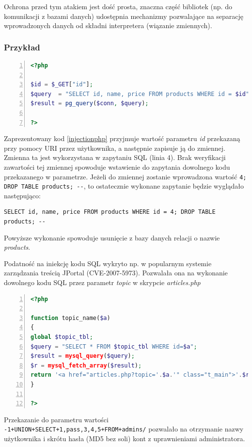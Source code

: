\documentclass[11pt,a4paper,polish,thesis]{dcsbook}
\begin{document}
Ochrona przed tym atakiem jest dość prosta, znaczna część bibliotek (np. do komunikacji z bazami danych) udostępnia mechanizmy pozwalające na separację wprowadzonych danych od składni interpretera (wiązanie zmiennych).

\subsubsection*{Przykład}
\begin{lstlisting}[language=php,frame=single,caption=kod podatny na iniekcję,label=injectionphp,numbers=left]
<?php

$id = $_GET["id"];
$query  = "SELECT id, name, price FROM products WHERE id = $id";
$result = pg_query($conn, $query);

?>
\end{lstlisting}
Zaprezentowany kod \ref{injectionphp} przyjmuje wartość parametru \textit{id} przekazaną przy pomocy URI przez użytkownika, a następnie zapisuje ją do zmiennej. Zmienna ta jest wykorzystana w zapytaniu SQL (linia 4). Brak weryfikacji zawartości tej zmiennej spowoduje wstawienie do zapytania dowolnego kodu przekazanego w parametrze. Jeżeli do zmiennej zostanie wprowadzona wartość \lstinline[frame=single]|4; DROP TABLE products; --|, to ostatecznie wykonane zapytanie będzie wyglądało następująco: 
\begin{lstlisting}
SELECT id, name, price FROM products WHERE id = 4; DROP TABLE products; --
\end{lstlisting}
Powyższe wykonanie spowoduje usunięcie z bazy danych relacji o nazwie \textit{products}.

Podatność na iniekcję kodu SQL wykryto np. w popularnym systemie zarządzania treścią JPortal (CVE-2007-5973). Pozwalała ona na wykonanie dowolnego kodu SQL przez parametr \textit{topic} w skrypcie \textit{articles.php}

\begin{lstlisting}[language=php,frame=single,caption=podatność articles.php w systemie JPortal,label=injectionjportal,numbers=left]
<?php

function topic_name($a)  
{     
global $topic_tbl; 
$query = "SELECT * FROM $topic_tbl WHERE id=$a"; 
$result = mysql_query($query);   
$r = mysql_fetch_array($result);     
return '<a href="articles.php?topic='.$a.'" class="t_main">'.$r['title'].'</a>';   
} 

?>
\end{lstlisting}

Przekazanie do parametru wartości \lstinline|-1+UNION+SELECT+1,pass,3,4,5+FROM+admins/| pozwalało na otrzymanie nazwy użytkownika i skrótu hasła (MD5 bez soli) kont z uprawnieniami administratora.
\end{document}
